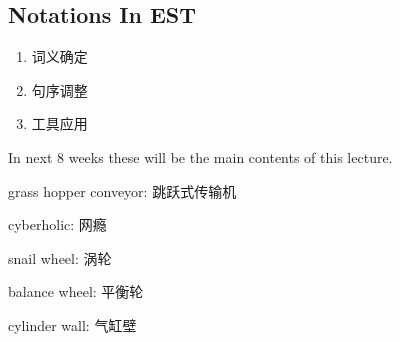 \subsection{Notations In EST}%
\label{sub:Notations In EST}
\begin{enumerate}
    \item 词义确定
    \item 句序调整
    \item 工具应用
\end{enumerate}
In next 8 weeks these will be the main contents of this lecture.
\begin{eg}
    grass hopper conveyor: 跳跃式传输机

    cyberholic: 网瘾

    snail wheel: 涡轮

    balance wheel: 平衡轮

    cylinder wall: 气缸壁
\end{eg}

